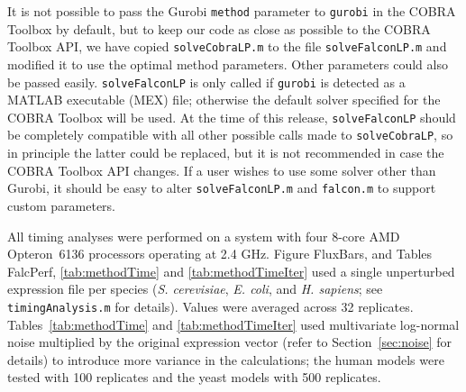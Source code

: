 It is not possible to pass the Gurobi \texttt{method} parameter to
\texttt{gurobi} in the COBRA Toolbox by default, but to keep our code
as close as possible to the COBRA Toolbox API, we have copied
\texttt{solveCobraLP.m} to the file \texttt{solveFalconLP.m} and
modified it to use the optimal method parameters. Other parameters
could also be passed easily. \texttt{solveFalconLP} is only called if
\texttt{gurobi} is detected as a MATLAB executable (MEX) file;
otherwise the default solver specified for the COBRA Toolbox will be
used. At the time of this release, \texttt{solveFalconLP} should be
completely compatible with all other possible calls made to
\texttt{solveCobraLP}, so in principle the latter could be replaced,
but it is not recommended in case the COBRA Toolbox API changes. If a
user wishes to use some solver other than Gurobi, it should be easy to
alter \texttt{solveFalconLP.m} and \texttt{falcon.m} to support custom
parameters. 

All timing analyses were performed on a system with four 8-core AMD
Opteron\texttrademark\ 6136 processors operating at 2.4 GHz. Figure
FluxBars, and Tables FalcPerf, \ref{tab:methodTime} and
\ref{tab:methodTimeIter} used a single unperturbed expression file per
species (\textit{S. cerevisiae}, \textit{E. coli}, and
\textit{H. sapiens}; see \texttt{timingAnalysis.m} for
details). Values were averaged across 32
replicates. Tables~\ref{tab:methodTime} and \ref{tab:methodTimeIter}
used multivariate log-normal noise multiplied by the original
expression vector (refer to Section~\ref{sec:noise} for details) to
introduce more variance in the calculations; the human models were
tested with 100 replicates and the yeast models with 500 replicates.
